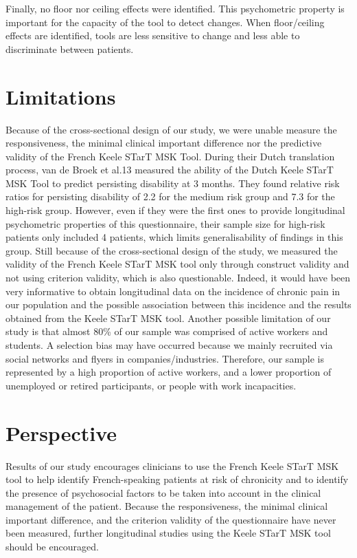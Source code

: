 Finally, no floor nor ceiling effects were identified. This psychometric property is important for the capacity of the tool to detect changes. When floor/ceiling effects are identified, tools are less sensitive to change and less able to discriminate between patients. 


\section{Limitations}
Because of the cross-sectional design of our study, we were unable measure the responsiveness, the minimal clinical important difference nor the predictive validity of the French Keele STarT MSK Tool. During their Dutch translation process, van de Broek et al.13 measured the ability of the Dutch Keele STarT MSK Tool to predict persisting disability at 3 months. They found relative risk ratios for persisting disability of 2.2 for the medium risk group and 7.3 for the high-risk group. However, even if they were the first ones to provide longitudinal psychometric properties of this questionnaire, their sample size for high-risk patients only included 4 patients, which limits generalisability of findings in this group. Still because of the cross-sectional design of the study, we measured the validity of the French Keele STarT MSK tool only through construct validity and not using criterion validity, which is also questionable. Indeed, it would have been very informative to obtain longitudinal data on the incidence of chronic pain in our population and the possible association between this incidence and the results obtained from the Keele STarT MSK tool. 
Another possible limitation of our study is that almost 80\% of our sample was comprised of active workers and students. A selection bias may have occurred because we mainly recruited via social networks and flyers in companies/industries. Therefore, our sample is represented by a high proportion of active workers, and a lower proportion of unemployed or retired participants, or people with work incapacities. 


\section{Perspective}
Results of our study encourages clinicians to use the French Keele STarT MSK tool to help identify French-speaking patients at risk of chronicity and to identify the presence of psychosocial factors to be taken into account in the clinical management of the patient. Because the responsiveness, the minimal clinical important difference, and the criterion validity of the questionnaire have never been measured, further longitudinal studies using the Keele STarT MSK tool should be encouraged.


